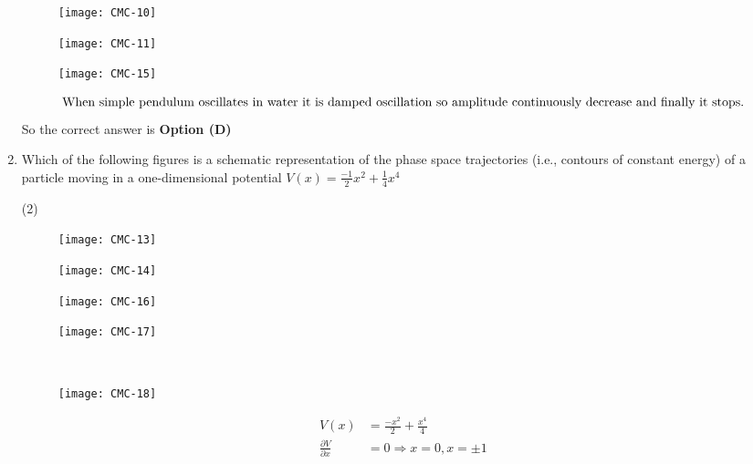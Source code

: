 \begin{enumerate}
\begin{tasks}
\begin{figure}[H]
	\centering
	\texttt{[image: CMC-10]}
\end{figure}
\task[\textbf{C.}] \begin{figure}[H]
	\centering
	\texttt{[image: CMC-11]}
\end{figure}
\task[\textbf{D.}] \begin{figure}[H]
	\centering
	\texttt{[image: CMC-15]}
\end{figure}
\end{tasks}
\begin{answer}
\begin{align*}
\intertext{When simple pendulum oscillates in water it is damped oscillation so amplitude continuously decrease and finally it stops.}
\end{align*}
So the correct answer is \textbf{Option (D)}
\end{answer}
\item Which of the following figures is a schematic representation of the phase space trajectories (i.e., contours of constant energy) of a particle moving in a one-dimensional potential $V(x)=\frac{-1}{2} x^{2}+\frac{1}{4} x^{4}$
{}
\begin{tasks}(2)
\task[\textbf{A.}] \begin{figure}[H]
	\centering
	\texttt{[image: CMC-13]}
\end{figure}
\task[\textbf{B.}] \begin{figure}[H]
	\centering
	\texttt{[image: CMC-14]}
\end{figure}
\task[\textbf{C.}] \begin{figure}[H]
	\centering
	\texttt{[image: CMC-16]}
\end{figure}
\task[\textbf{D.}] \begin{figure}[H]
	\centering
	\texttt{[image: CMC-17]}
\end{figure}
\end{tasks}
\begin{answer}$\left. \right. $
\begin{figure}[H]
	\centering
	\texttt{[image: CMC-18]}
\end{figure}
\begin{align*}
V(x)&=\frac{-x^{2}}{2}+\frac{x^{4}}{4}\\
\frac{\partial V}{\partial x}&=0 \Rightarrow x=0, x=\pm 1\\

\end{align*}
\end{answer}
\end{enumerate}
